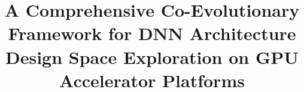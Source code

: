\documentclass[conference]{IEEEtran}
\begin{document}
\title{A Comprehensive Co-Evolutionary Framework for DNN Architecture Design Space Exploration on GPU Accelerator Platforms}


\maketitle
\end{document}
